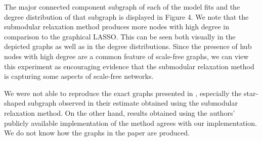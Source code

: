 \documentclass{uwstat572}
\theoremstyle{remark}
\theoremstyle{definition}
\begin{document}
The major connected component subgraph of each of the model fits and the degree distribution of that subgraph is displayed in Figure 4. We note that the submodular relaxation method produces more nodes with high degree in comparison to the graphical LASSO. This can be seen both visually in the depicted graphs as well as in the degree distributions.  Since the presence of hub nodes with high degree are a common feature of scale-free graphs, we can view this experiment as encouraging evidence that the submodular relaxation method is capturing some aspects of scale-free networks.

We were not able to reproduce the exact graphs presented in \cite{Defazio2012}, especially the star-shaped subgraph observed in their estimate obtained using the submodular relaxation method.  On the other hand, results obtained using the authors' publicly available implementation of the method agrees with our implementation.  We do not know how the graphs in the paper are produced. 
\end{document}
